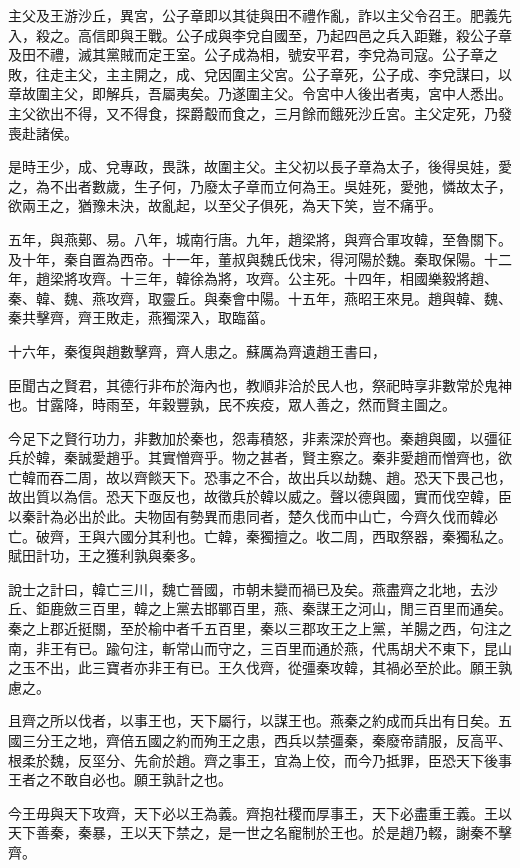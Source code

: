 主父及王游沙丘，異宮，公子章即以其徒與田不禮作亂，詐以主父令召王。肥義先入，殺之。高信即與王戰。公子成與李兌自國至，乃起四邑之兵入距難，殺公子章及田不禮，滅其黨賊而定王室。公子成為相，號安平君，李兌為司寇。公子章之敗，往走主父，主主開之，成、兌因圍主父宮。公子章死，公子成、李兌謀曰，以章故圍主父，即解兵，吾屬夷矣。乃遂圍主父。令宮中人後出者夷，宮中人悉出。主父欲出不得，又不得食，探爵鷇而食之，三月餘而餓死沙丘宮。主父定死，乃發喪赴諸侯。

是時王少，成、兌專政，畏誅，故圍主父。主父初以長子章為太子，後得吳娃，愛之，為不出者數歲，生子何，乃廢太子章而立何為王。吳娃死，愛弛，憐故太子，欲兩王之，猶豫未決，故亂起，以至父子俱死，為天下笑，豈不痛乎。

五年，與燕鄚、易。八年，城南行唐。九年，趙梁將，與齊合軍攻韓，至魯關下。及十年，秦自置為西帝。十一年，董叔與魏氏伐宋，得河陽於魏。秦取保陽。十二年，趙梁將攻齊。十三年，韓徐為將，攻齊。公主死。十四年，相國樂毅將趙、秦、韓、魏、燕攻齊，取靈丘。與秦會中陽。十五年，燕昭王來見。趙與韓、魏、秦共擊齊，齊王敗走，燕獨深入，取臨菑。

十六年，秦復與趙數擊齊，齊人患之。蘇厲為齊遺趙王書曰，

臣聞古之賢君，其德行非布於海內也，教順非洽於民人也，祭祀時享非數常於鬼神也。甘露降，時雨至，年穀豐孰，民不疾疫，眾人善之，然而賢主圖之。

今足下之賢行功力，非數加於秦也，怨毒積怒，非素深於齊也。秦趙與國，以彊征兵於韓，秦誠愛趙乎。其實憎齊乎。物之甚者，賢主察之。秦非愛趙而憎齊也，欲亡韓而吞二周，故以齊餤天下。恐事之不合，故出兵以劫魏、趙。恐天下畏己也，故出質以為信。恐天下亟反也，故徵兵於韓以威之。聲以德與國，實而伐空韓，臣以秦計為必出於此。夫物固有勢異而患同者，楚久伐而中山亡，今齊久伐而韓必亡。破齊，王與六國分其利也。亡韓，秦獨擅之。收二周，西取祭器，秦獨私之。賦田計功，王之獲利孰與秦多。

說士之計曰，韓亡三川，魏亡晉國，市朝未變而禍已及矣。燕盡齊之北地，去沙丘、鉅鹿斂三百里，韓之上黨去邯鄲百里，燕、秦謀王之河山，閒三百里而通矣。秦之上郡近挺關，至於榆中者千五百里，秦以三郡攻王之上黨，羊腸之西，句注之南，非王有已。踰句注，斬常山而守之，三百里而通於燕，代馬胡犬不東下，昆山之玉不出，此三寶者亦非王有已。王久伐齊，從彊秦攻韓，其禍必至於此。願王孰慮之。

且齊之所以伐者，以事王也，天下屬行，以謀王也。燕秦之約成而兵出有日矣。五國三分王之地，齊倍五國之約而殉王之患，西兵以禁彊秦，秦廢帝請服，反高平、根柔於魏，反坙分、先俞於趙。齊之事王，宜為上佼，而今乃抵罪，臣恐天下後事王者之不敢自必也。願王孰計之也。

今王毋與天下攻齊，天下必以王為義。齊抱社稷而厚事王，天下必盡重王義。王以天下善秦，秦暴，王以天下禁之，是一世之名寵制於王也。於是趙乃輟，謝秦不擊齊。

